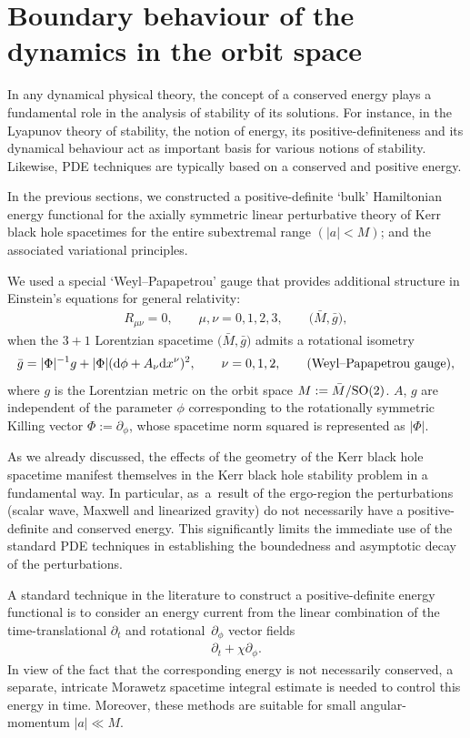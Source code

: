 \documentclass[pdftex]{sigma}
\def\ptl{\partial}%
\numberwithin{equation}{section}
\begin{document}
\section{Boundary behaviour of the dynamics in the orbit space}\label{section5}

In any dynamical physical theory, the concept of a conserved energy plays a fundamental role in the analysis of stability of its solutions. For instance, in the Lyapunov theory of stability, the notion of energy,
its positive-definiteness and its dynamical behaviour act as important basis for various notions of stability. Likewise, PDE techniques are typically based on a conserved and positive energy.

In the previous sections, we constructed a positive-definite `bulk' Hamiltonian energy functional for the axially symmetric linear perturbative theory of Kerr black hole spacetimes for the entire subextremal range $(\vert a \vert<M)$; and the associated variational principles.

We used a special `Weyl--Papapetrou' gauge that provides additional structure in Einstein's equations for general relativity:
\begin{align*}
R_{\mu \nu} =0, \qquad \mu, \nu=0, 1,2, 3, \qquad \bigl(\bar{M}, \bar{g}\bigr),
\end{align*}
when the $3+1$ Lorentzian spacetime $\bigl(\bar{M}, \bar{g}\bigr)$ admits a rotational isometry
\begin{align} \label{WP-gauge}
\bar{g} = \vert \Phi \vert^{-1} g + \vert \Phi \vert ({\rm d}\phi + A_\nu {\rm d}x^\nu)^2, \qquad \nu = 0,1, 2, \qquad \text{(Weyl--Papapetrou gauge)},
\end{align}
where $g$ is the Lorentzian metric on the orbit space $M := \bar{M}/{\rm SO}(2)$. $A$, $g$ are independent of the parameter $\phi$ corresponding to the rotationally symmetric Killing vector $\Phi :=\ptl_\phi$, whose spacetime norm squared is represented as $\vert \Phi \vert$.

As we already discussed, the effects of the geometry of the Kerr black hole spacetime manifest themselves in the Kerr black hole stability problem in a fundamental way. In particular, as~a~result of the ergo-region the perturbations (scalar wave, Maxwell and linearized gravity) do not necessarily have a positive-definite and conserved energy. This significantly limits the immediate use of the standard PDE techniques in establishing the boundedness and asymptotic decay of the perturbations.

A standard technique in the literature to construct a positive-definite energy functional is to consider an energy current from the linear combination of the time-translational $\ptl_t$ and rotational~$\ptl_\phi$ vector fields
\begin{align*}
\ptl_ t + \chi \ptl_\phi.
\end{align*}
 In view of the fact that the corresponding energy is not necessarily conserved, a separate, intricate Morawetz spacetime integral estimate is needed to control this energy in time. Moreover, these methods are suitable for small angular-momentum $\vert a \vert \ll M$.
\end{document}
